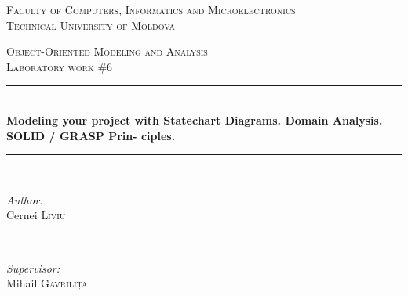 \documentclass[12pt,a4paper,titlepage]{article}
\begin{document}
\begin{titlepage}

  \begin{center} %

  \textsc{\large Faculty of Computers, Informatics and Microelectronics}\\[0.5cm]
  \textsc{\large Technical University of Moldova}\\[1.2cm] %
  \vspace{25 mm}

  \textsc{\Large Object-Oriented Modeling and Analysis}\\[0.5cm] %
  \textsc{\large Laboratory work \#6}\\[0.5cm] %

\newcommand{\HRule}{\rule{\linewidth}{0.5mm}} %

  \vspace{10 mm}
  \HRule \\[0.4cm]
  { \LARGE \bfseries Modeling your project with Statechart Diagrams. Domain Analysis. SOLID / GRASP Prin-
ciples. }\\[0.4cm] %
  \HRule \\[1.5cm]

      \vspace{30mm}

      \begin{minipage}{0.4\textwidth}
      \begin{flushleft} \large
      \emph{Author:}\\
      Cernei \textsc{Liviu}
      \end{flushleft}
      \end{minipage}
      ~
      \begin{minipage}{0.4\textwidth}
      \begin{flushright} \large
      \emph{Supervisor:} \\
      Mihail \textsc{Gavrilița} %
      \end{flushright}
      \end{minipage}\\[4cm]


\end{center}
\end{titlepage}
\end{document}
